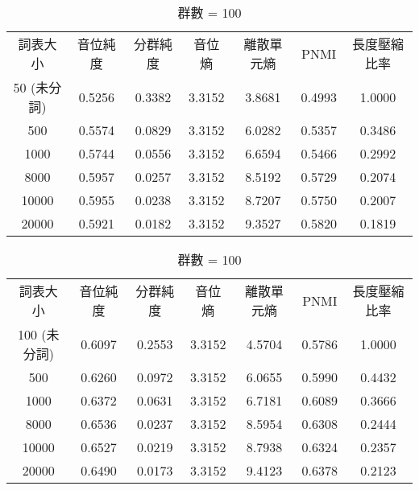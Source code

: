         \begin{table}[!htbp]
            \centering
            \begin{subtable}[t]{\textwidth}
                \centering
                \begin{tabular}{|c|c|c|c|c|c|c|} \hline 
                        詞表大小  & 音位純度 & 分群純度 & 音位熵 & 離散單元熵 &    PNMI & 長度壓縮比率 \\
 50 (未分詞)& 0.5256& 0.3382& 3.3152& 3.8681& 0.4993&1.0000\\ \hline 
                           500  &   0.5574   &  0.0829 &   3.3152  &  6.0282 & 0.5357 & 0.3486  \\ \hline %
                          1000  &   0.5744   &  0.0556 &   3.3152  &  6.6594 & 0.5466 & 0.2992  \\ \hline %
                          8000  &   0.5957   &  0.0257 &   3.3152  &  8.5192 & 0.5729 & 0.2074  \\ \hline %
                         10000  &   0.5955   &  0.0238 &   3.3152  &  8.7207 & 0.5750 & 0.2007  \\ \hline %
                         20000  &   0.5921   &  0.0182 &   3.3152  &  9.3527 & 0.5820 & 0.1819  \\ \hline %
                \end{tabular}
\caption{群數 = 50}
                \label{tab:ch4-hubert-phn-clu050}
            \end{subtable}        

            \vspace{0.01cm}        

            \begin{subtable}[t]{\textwidth}
                \centering
                \begin{tabular}{|c|c|c|c|c|c|c|} \hline 
                        詞表大小  & 音位純度 & 分群純度 & 音位熵 & 離散單元熵 &    PNMI & 長度壓縮比率 \\
 100 (未分詞)& 0.6097& 0.2553& 3.3152& 4.5704& 0.5786&1.0000\\ \hline 
                           500  &   0.6260   &  0.0972 &   3.3152  &  6.0655 & 0.5990 & 0.4432  \\ \hline %
                          1000  &   0.6372   &  0.0631 &   3.3152  &  6.7181 & 0.6089 & 0.3666  \\ \hline %
                          8000  &   0.6536   &  0.0237 &   3.3152  &  8.5954 & 0.6308 & 0.2444  \\ \hline %
                         10000  &   0.6527   &  0.0219 &   3.3152  &  8.7938 & 0.6324 & 0.2357  \\ \hline %
                         20000  &   0.6490   &  0.0173 &   3.3152  &  9.4123 & 0.6378 & 0.2123  \\ \hline %
                \end{tabular}
\caption{群數 = 100}
                \label{tab:ch4-hubert-phn-clu100}
            \end{subtable}        


\end{table}
